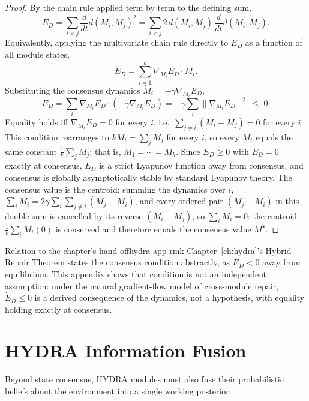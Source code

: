 \documentclass[12pt,twoside,openright]{book}
\begin{document}
\begin{proof}
  By the chain rule applied term by term to the defining
  sum,
  \[
    \dot{E}_D
    = \sum_{i<j} \frac{d}{dt} d(M_i, M_j)^2
    = \sum_{i<j} 2\, d(M_i, M_j) \, \frac{d}{dt} d(M_i, M_j).
  \]
  Equivalently, applying the multivariate chain rule
  directly to $E_D$ as a function of all module states,
  \[
    \dot{E}_D = \sum_{i=1}^k \nabla_{M_i} E_D \cdot \dot{M}_i.
  \]
  Substituting the consensus dynamics
  $\dot{M}_i = -\gamma \nabla_{M_i} E_D$,
  \[
    \dot{E}_D
    = \sum_i \nabla_{M_i}E_D \cdot (-\gamma \nabla_{M_i}E_D)
    = -\gamma \sum_i \|\nabla_{M_i}E_D\|^2
    \;\le\; 0.
  \]
  Equality holds iff $\nabla_{M_i}E_D = 0$ for every $i$,
  i.e.\ $\sum_{j\ne i}(M_i - M_j) = 0$ for every $i$. This
  condition rearranges to $kM_i = \sum_j M_j$ for every $i$,
  so every $M_i$ equals the same constant
  $\frac{1}{k}\sum_j M_j$; that is, $M_1 = \cdots = M_k$.
  Since $E_D \ge 0$ with $E_D = 0$ exactly at consensus,
  $E_D$ is a strict Lyapunov function away from consensus,
  and consensus is globally asymptotically stable by
  standard Lyapunov theory. The consensus value is the
  centroid: summing the dynamics over $i$,
  $\sum_i \dot{M}_i = 2\gamma \sum_i\sum_{j\ne i}(M_j - M_i)$,
  and every ordered pair $(M_j - M_i)$ in this double sum is
  cancelled by its reverse $(M_i - M_j)$, so
  $\sum_i \dot{M}_i = 0$: the centroid
  $\frac{1}{k}\sum_i M_i(0)$ is conserved and therefore
  equals the consensus value $M^\star$.
\end{proof}

\begin{remark}{Relation to the chapter's hand-off}{hydra-app-rmk}
  Chapter~\ref{ch:hydra}'s Hybrid Repair Theorem states the
  consensus condition abstractly, as
  $\dot{E}_D < 0$ away from equilibrium. This appendix shows
  that condition is not an independent assumption: under the
  natural gradient-flow model of cross-module repair,
  $\dot{E}_D \le 0$ is a derived consequence of the dynamics,
  not a hypothesis, with equality holding exactly at
  consensus.
\end{remark}

\section{HYDRA Information Fusion}

Beyond state consensus, HYDRA modules must also fuse their
probabilistic beliefs about the environment into a single
working posterior.
\end{document}
